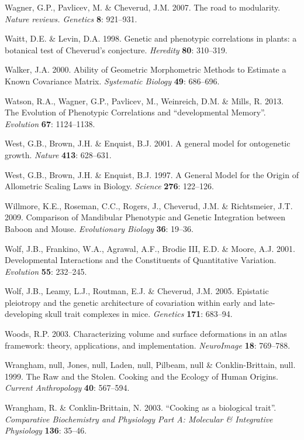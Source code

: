 \documentclass[12pt,twoside]{report}
\begin{document}
Wagner, G.P., Pavlicev, M. \& Cheverud, J.M. 2007. The road to
modularity. \emph{Nature reviews. Genetics} \textbf{8}: 921--931.

Waitt, D.E. \& Levin, D.A. 1998. Genetic and phenotypic correlations in
plants: a botanical test of Cheverud's conjecture. \emph{Heredity}
\textbf{80}: 310--319.

Walker, J.A. 2000. Ability of Geometric Morphometric Methods to Estimate
a Known Covariance Matrix. \emph{Systematic Biology} \textbf{49}:
686--696.

Watson, R.A., Wagner, G.P., Pavlicev, M., Weinreich, D.M. \& Mills, R.
2013. The Evolution of Phenotypic Correlations and ``developmental
Memory''. \emph{Evolution} \textbf{67}: 1124--1138.

West, G.B., Brown, J.H. \& Enquist, B.J. 2001. A general model for
ontogenetic growth. \emph{Nature} \textbf{413}: 628--631.

West, G.B., Brown, J.H. \& Enquist, B.J. 1997. A General Model for the
Origin of Allometric Scaling Laws in Biology. \emph{Science}
\textbf{276}: 122--126.

Willmore, K.E., Roseman, C.C., Rogers, J., Cheverud, J.M. \&
Richtsmeier, J.T. 2009. Comparison of Mandibular Phenotypic and Genetic
Integration between Baboon and Mouse. \emph{Evolutionary Biology}
\textbf{36}: 19--36.

Wolf, J.B., Frankino, W.A., Agrawal, A.F., Brodie III, E.D. \& Moore,
A.J. 2001. Developmental Interactions and the Constituents of
Quantitative Variation. \emph{Evolution} \textbf{55}: 232--245.

Wolf, J.B., Leamy, L.J., Routman, E.J. \& Cheverud, J.M. 2005. Epistatic
pleiotropy and the genetic architecture of covariation within early and
late-developing skull trait complexes in mice. \emph{Genetics}
\textbf{171}: 683--94.

Woods, R.P. 2003. Characterizing volume and surface deformations in an
atlas framework: theory, applications, and implementation.
\emph{NeuroImage} \textbf{18}: 769--788.

Wrangham, null, Jones, null, Laden, null, Pilbeam, null \&
Conklin-Brittain, null. 1999. The Raw and the Stolen. Cooking and the
Ecology of Human Origins. \emph{Current Anthropology} \textbf{40}:
567--594.

Wrangham, R. \& Conklin-Brittain, N. 2003. ``Cooking as a biological
trait''. \emph{Comparative Biochemistry and Physiology Part A: Molecular
\& Integrative Physiology} \textbf{136}: 35--46.
\end{document}
